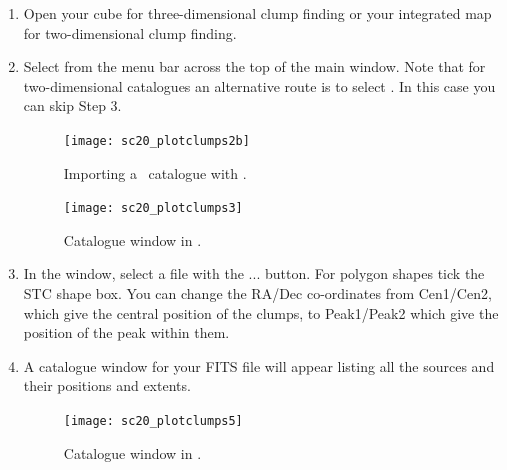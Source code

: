 \documentclass[11pt,oneside,chapters]{starlink}
\begin{document}
\begin{enumerate}[label=(\textbf{\arabic*})]
\item Open your cube for three-dimensional clump finding or your
integrated map for two-dimensional clump finding.

\item Select  from the menu bar across the top of the main window. Note
that for two-dimensional catalogues an alternative route is to select
. In this case you can skip
Step 3.

\begin{figure}[h!]
\begin{center}
\texttt{[image: sc20\_plotclumps2b]}
\caption[Importing a \cupid\ catalogue with \gaia.]{\label{fig:gaia_clumps1}
  Importing a \cupid\ catalogue with \gaia.}
\end{center}
\end{figure}

\begin{figure}[h!]
\begin{center}
\texttt{[image: sc20\_plotclumps3]}
\caption[Catalogue window in \gaia.]{\label{fig:gaia_clumps2}
  Catalogue window in \gaia.}
\end{center}
\end{figure}

\item In the  window, select a file
with the ... button. For polygon shapes tick
the STC shape box. You can change the RA/Dec co-ordinates from
Cen1/Cen2, which give the central position of the clumps, to
Peak1/Peak2 which give the position of the peak within them.

\item A catalogue window for your FITS file will appear listing all
the sources and their positions and extents.

\begin{figure}[h!]
\begin{center}
\texttt{[image: sc20\_plotclumps5]}
\caption[Catalogue window in \gaia.]{\label{fig:gaia_clumps3}
  Catalogue window in \gaia.}
\end{center}
\end{figure}


\end{enumerate}
\end{document}
